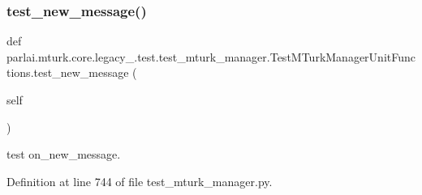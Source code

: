 \subsubsection{\texorpdfstring{test\+\_\+new\+\_\+message()}{test\_new\_message()}}
{\footnotesize\ttfamily def parlai.\+mturk.\+core.\+legacy\+\_.\+test.\+test\+\_\+mturk\+\_\+manager.\+Test\+M\+Turk\+Manager\+Unit\+Functions.\+test\+\_\+new\+\_\+message (\begin{DoxyParamCaption}\item[{}]{self }\end{DoxyParamCaption})}

\begin{DoxyVerb}test on_new_message.
\end{DoxyVerb}
 

Definition at line 744 of file test\+\_\+mturk\+\_\+manager.\+py.


